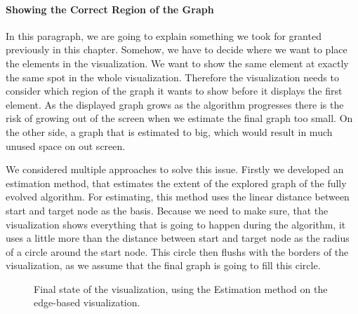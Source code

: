 \documentclass
[
    paper = a4,
    pagesize,
    12 pt,
    oneside,                       %
    open = right,
    DIV = calc,
    BCOR = 0 mm,                   %
    bibtotoc
]
{scrbook}
\begin{document}
\paragraph{Showing the Correct Region of the Graph}
In this paragraph, we are going to explain something we took for granted previously in this chapter.
Somehow, we have to decide where we want to place the elements in the visualization.
We want to show the same element at exactly the same spot in the whole visualization.
Therefore the visualization needs to consider which region of the graph it wants to show before it displays the first element.
As the displayed graph grows as the algorithm progresses there is the risk of growing out of the screen when we estimate the final graph too small.
On the other side, a graph that is estimated to big, which would result in much unused space on out screen.

We considered multiple approaches to solve this issue.
Firstly we developed an estimation method, that estimates the extent of the explored graph of the fully evolved algorithm.
For estimating, this method uses the linear distance between start and target node as the basis.
Because we need to make sure, that the visualization shows everything that is going to happen during the algorithm, it uses a little more than the distance between start and target node as the radius of a circle around the start node.
This circle then flushs with the borders of the visualization, as we assume that the final graph is going to fill this circle.

\begin{figure}
\caption[]{Final state of the visualization, using the Estimation method on the edge-based visualization.}
\label{fig:estimation}
\end{figure}
\end{document}
